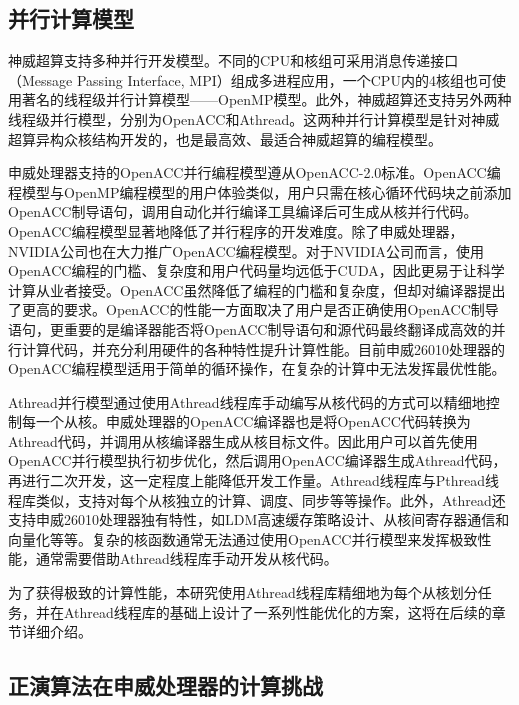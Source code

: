 
\subsection{并行计算模型} %
\label{sub:并行计算模型}

神威超算支持多种并行开发模型。不同的CPU和核组可采用消息传递接口（Message Passing Interface, MPI）组成多进程应用，一个CPU内的4核组也可使用著名的线程级并行计算模型——OpenMP模型。此外，神威超算还支持另外两种线程级并行模型，分别为OpenACC和Athread。这两种并行计算模型是针对神威超算异构众核结构开发的，也是最高效、最适合神威超算的编程模型。

申威处理器支持的OpenACC并行编程模型遵从OpenACC-2.0标准。OpenACC编程模型与OpenMP编程模型的用户体验类似，用户只需在核心循环代码块之前添加OpenACC制导语句，调用自动化并行编译工具编译后可生成从核并行代码。OpenACC编程模型显著地降低了并行程序的开发难度。除了申威处理器，NVIDIA公司也在大力推广OpenACC编程模型。对于NVIDIA公司而言，使用OpenACC编程的门槛、复杂度和用户代码量均远低于CUDA，因此更易于让科学计算从业者接受。OpenACC虽然降低了编程的门槛和复杂度，但却对编译器提出了更高的要求。OpenACC的性能一方面取决了用户是否正确使用OpenACC制导语句，更重要的是编译器能否将OpenACC制导语句和源代码最终翻译成高效的并行计算代码，并充分利用硬件的各种特性提升计算性能。目前申威26010处理器的OpenACC编程模型适用于简单的循环操作，在复杂的计算中无法发挥最优性能。

Athread并行模型通过使用Athread线程库手动编写从核代码的方式可以精细地控制每一个从核。申威处理器的OpenACC编译器也是将OpenACC代码转换为Athread代码，并调用从核编译器生成从核目标文件。因此用户可以首先使用OpenACC并行模型执行初步优化，然后调用OpenACC编译器生成Athread代码，再进行二次开发，这一定程度上能降低开发工作量。Athread线程库与Pthread线程库类似，支持对每个从核独立的计算、调度、同步等等操作。此外，Athread还支持申威26010处理器独有特性，如LDM高速缓存策略设计、从核间寄存器通信和向量化等等。复杂的核函数通常无法通过使用OpenACC并行模型来发挥极致性能，通常需要借助Athread线程库手动开发从核代码。

为了获得极致的计算性能，本研究使用Athread线程库精细地为每个从核划分任务，并在Athread线程库的基础上设计了一系列性能优化的方案，这将在后续的章节详细介绍。


\subsection{正演算法在申威处理器的计算挑战} %

